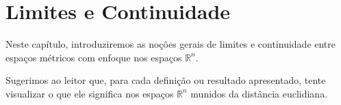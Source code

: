 \chapter{Limites e Continuidade}
Neste capítulo, introduziremos as noções gerais de limites e continuidade entre espaços métricos com enfoque nos espaços $\mathbb R^n$.

Sugerimos ao leitor que, para cada definição ou resultado apresentado, tente visualizar o que ele significa nos espaços $\mathbb R^n$ munidos da distância euclidiana.





